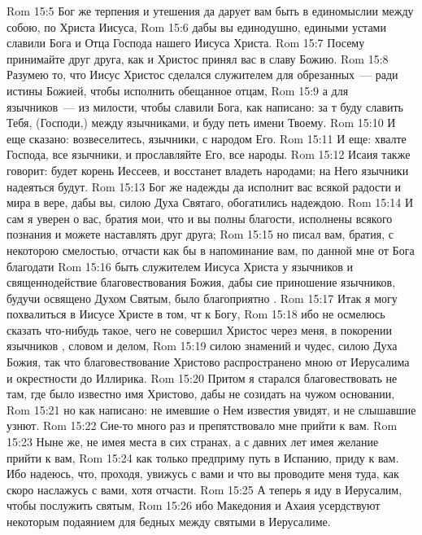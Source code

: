 \vs Rom 15:5 Бог же терпения и утешения да дарует вам быть в единомыслии между собою, по  Христа Иисуса,
\vs Rom 15:6 дабы вы единодушно, едиными устами славили Бога и Отца Господа нашего Иисуса Христа.
\vs Rom 15:7 Посему принимайте друг друга, как и Христос принял вас в славу Божию.
\rsbpar\vs Rom 15:8 Разумею то, что Иисус Христос сделался служителем для обрезанных~--- ради истины Божией, чтобы исполнить обещанное отцам,
\vs Rom 15:9 а для язычников~--- из милости, чтобы славили Бога, как написано: за т буду славить Тебя, (Господи,) между язычниками, и буду петь имени Твоему.
\vs Rom 15:10 И еще сказано: возвеселитесь, язычники, с народом Его.
\vs Rom 15:11 И еще: хвалте Господа, все язычники, и прославляйте Его, все народы.
\vs Rom 15:12 Исаия также говорит: будет корень Иессеев, и восстанет владеть народами; на Него язычники надеяться будут.
\vs Rom 15:13 Бог же надежды да исполнит вас всякой радости и мира в вере, дабы вы, силою Духа Святаго, обогатились надеждою.
\rsbpar\vs Rom 15:14 И сам я уверен о вас, братия мои, что и вы полны благости, исполнены всякого познания и можете наставлять друг друга;
\vs Rom 15:15 но писал вам, братия, с некоторою смелостью, отчасти как бы в напоминание вам, по данной мне от Бога благодати
\vs Rom 15:16 быть служителем Иисуса Христа у язычников и  священнодействие благовествования Божия, дабы сие приношение язычников, будучи освящено Духом Святым, было благоприятно .
\vs Rom 15:17 Итак я могу похвалиться в Иисусе Христе в том, чт  к Богу,
\vs Rom 15:18 ибо не осмелюсь сказать что-нибудь такое, чего не совершил Христос через меня, в покорении язычников , словом и делом,
\vs Rom 15:19 силою знамений и чудес, силою Духа Божия, так что благовествование Христово распространено мною от Иерусалима и окрестности до Иллирика.
\vs Rom 15:20 Притом я старался благовествовать не там, где  было известно имя Христово, дабы не созидать на чужом основании,
\vs Rom 15:21 но как написано: не имевшие о Нем известия увидят, и не слышавшие узнют.
\vs Rom 15:22 Сие-то много раз и препятствовало мне прийти к вам.
\vs Rom 15:23 Ныне же, не имея  места в сих странах, а с давних лет имея желание прийти к вам,
\vs Rom 15:24 как только предприму путь в Испанию, приду к вам. Ибо надеюсь, что, проходя, увижусь с вами и что вы проводите меня туда, как скоро наслажусь  с вами, хотя отчасти.
\vs Rom 15:25 А теперь я иду в Иерусалим, чтобы послужить святым,
\vs Rom 15:26 ибо Македония и Ахаия усердствуют некоторым подаянием для бедных между святыми в Иерусалиме.
